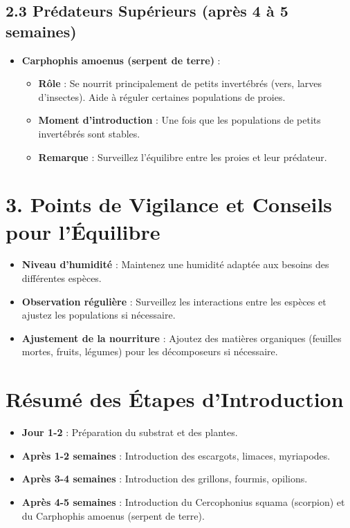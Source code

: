 \subsection*{2.3 Prédateurs Supérieurs (après 4 à 5 semaines)}
\begin{itemize}
    \item \textbf{Carphophis amoenus (serpent de terre)} :
    \begin{itemize}
        \item \textbf{Rôle} : Se nourrit principalement de petits invertébrés (vers, larves d'insectes). Aide à réguler certaines populations de proies.
        \item \textbf{Moment d'introduction} : Une fois que les populations de petits invertébrés sont stables.
        \item \textbf{Remarque} : Surveillez l'équilibre entre les proies et leur prédateur.
    \end{itemize}
\end{itemize}

\section*{3. Points de Vigilance et Conseils pour l'Équilibre}
\begin{itemize}
    \item \textbf{Niveau d'humidité} : Maintenez une humidité adaptée aux besoins des différentes espèces.
    \item \textbf{Observation régulière} : Surveillez les interactions entre les espèces et ajustez les populations si nécessaire.
    \item \textbf{Ajustement de la nourriture} : Ajoutez des matières organiques (feuilles mortes, fruits, légumes) pour les décomposeurs si nécessaire.
\end{itemize}

\section*{Résumé des Étapes d'Introduction}
\begin{itemize}
    \item \textbf{Jour 1-2} : Préparation du substrat et des plantes.
    \item \textbf{Après 1-2 semaines} : Introduction des escargots, limaces, myriapodes.
    \item \textbf{Après 3-4 semaines} : Introduction des grillons, fourmis, opilions.
    \item \textbf{Après 4-5 semaines} : Introduction du Cercophonius squama (scorpion) et du Carphophis amoenus (serpent de terre).
\end{itemize}


